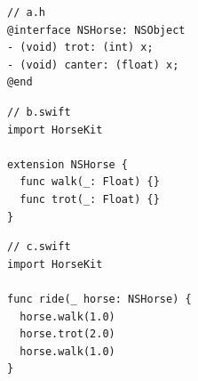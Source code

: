 \documentclass[../generics]{subfiles}
\begin{document}
\begin{listing}\label{lazy member listing}
\begin{Verbatim}
// a.h
@interface NSHorse: NSObject
- (void) trot: (int) x;
- (void) canter: (float) x;
@end
\end{Verbatim}
\begin{Verbatim}
// b.swift
import HorseKit

extension NSHorse {
  func walk(_: Float) {}
  func trot(_: Float) {}
}
\end{Verbatim}
\begin{Verbatim}
// c.swift
import HorseKit

func ride(_ horse: NSHorse) {
  horse.walk(1.0)
  horse.trot(2.0)
  horse.walk(1.0)
}
\end{Verbatim}
\end{listing}
\end{document}
